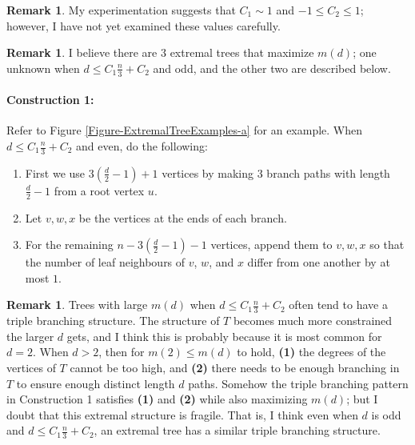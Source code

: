 \documentclass[12]{article}
\theoremstyle{definition}
\newtheorem{rem}[thm]{Remark}
\begin{document}
	\begin{rem}
		My experimentation suggests that $C_1 \sim 1$ and $-1 \leq C_2 \leq 1$; however, I have not yet examined these values carefully.
	\end{rem}
	
	
	\begin{rem}
		I believe there are $3$ extremal trees that maximize $m(d)$; one unknown when $d \leq C_1\frac{n}{3} + C_2$ and odd, and the other two are described below.  
	\end{rem}
	
	\paragraph{Construction 1:} Refer to Figure \ref{Figure-ExtremalTreeExamples-a} for an example.  When $d \leq C_1\frac{n}{3}+C_2$ and even, do the following:
	\begin{enumerate}
		\item First we use $3(\frac{d}{2} - 1) + 1$ vertices by making $3$ branch paths with length $\frac{d}{2}-1$ from a root vertex $u$.  
		
		\item Let $v,w,x$ be the vertices at the ends of each branch.  
		
		\item For the remaining $n-3(\frac{d}{2} - 1) - 1$ vertices, append them to $v,w,x$ so that the number of leaf neighbours of $v$, $w$, and $x$ differ from one another by at most $1$.
	\end{enumerate}

	\begin{rem}
		Trees with large $m(d)$ when $d  \leq C_1\frac{n}{3} + C_2$ often tend to have a triple branching structure.  The structure of $T$ becomes much more constrained the larger $d$ gets, and I think this is probably because it is most common for $d = 2$.  When $d > 2$, then for $m(2) \leq m(d)$ to hold, \textbf{(1)} the degrees of the vertices of $T$ cannot be too high, and \textbf{(2)} there needs to be enough branching in $T$ to ensure enough distinct length $d$ paths.  Somehow the triple branching pattern in Construction 1 satisfies \textbf{(1)} and \textbf{(2)} while also maximizing $m(d)$; but I doubt that this extremal structure is fragile.  That is, I think even when $d$ is odd and $d  \leq C_1\frac{n}{3} + C_2$, an extremal tree has a similar triple branching structure.
	\end{rem}
	
\end{document}

